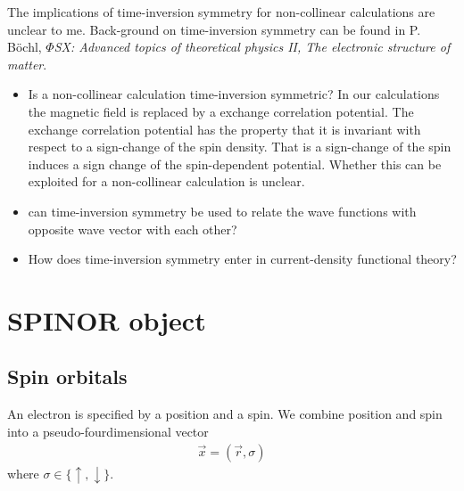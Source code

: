 \documentclass[11pt,a4paper]{report}
\begin{document}
 The implications of time-inversion symmetry for
non-collinear calculations are unclear to me. Back-ground on
time-inversion symmetry can be found in P. B\"ochl, \textit{$\Phi$SX:
  Advanced topics of theoretical physics II, The electronic structure
  of matter}.
\begin{itemize}
\item Is a non-collinear calculation time-inversion symmetric? 
  In our
  calculations the magnetic field is replaced by a exchange
  correlation potential. The exchange correlation potential has the
  property that it is invariant with respect to a sign-change of the
  spin density. That is a sign-change of the spin induces a sign
  change of the spin-dependent potential. Whether this can be
  exploited for a non-collinear calculation is unclear.
%
\item can time-inversion symmetry be used to relate the wave functions
  with opposite wave vector with each other?
%
\item How does time-inversion symmetry enter in current-density
  functional theory?
\end{itemize}

\chapter{SPINOR object}
\label{sec:spinorb}
\section{Spin orbitals}
\label{sec:spinorbitals}
An electron is specified by a position and a spin. We combine position
and spin into a pseudo-fourdimensional vector
\begin{eqnarray}
\vec{x}=(\vec{r},\sigma)
\label{eq:spinorbdefx}
\end{eqnarray}
where $\sigma\in\{\uparrow,\downarrow\}$.
\end{document}
